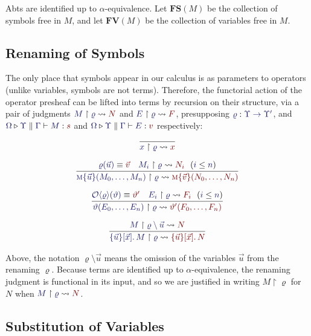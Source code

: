 \documentclass[11pt]{article}
\theoremstyle{definition}
\theoremstyle{remark}
\numberwithin{equation}{section}
\def\IModeColorName{MidnightBlue}
\def\OModeColorName{Maroon}
\newcommand\IMode[1]{{\color{\IModeColorName}{#1}}}
\newcommand\OMode[1]{{\color{\OModeColorName}{#1}}}
\newcommand\HypJ[2]{#1\ \ (#2)}
\newcommand\Of[2]{\IMode{#1} : \IMode{#2}}
\newcommand\MkBTm[3]{\{#1\}[#2].\, #3}
\newcommand\Leq[2]{\IMode{#1}\leq\IMode{#2}}
\newcommand\Match[2]{\IMode{#1}\equiv\OMode{#2}}
\newcommand\Operators{\mathcal{O}}
\newcommand\FLift[2]{
  \Operators\langle#1%
  \ifthenelse{\equal{#2}{}}{}{, #2}\rangle
}
\newcommand\IsAbt[5]{%
  \IMode{#1}\triangleright%
  \IMode{#2}\parallel%
  \IMode{#3}\vdash%
  \IMode{#4}:\OMode{#5}%
}
\newcommand\MV[1]{\textsc{#1}}
\newcommand\MApp[3]{#1\{#2\}(#3)}
\newcommand\App[2]{#1(#2)}
\newcommand\FV[1]{\mathbf{FV}\left(#1\right)}
\newcommand\FS[1]{\mathbf{FS}\left(#1\right)}
\newcommand\Rename[2]{
  #2\upharpoonright #1
}
\newcommand\IsRenaming[3]{
  \Rename{\IMode{#1}}{\IMode{#2}}%
  \leadsto\OMode{#3}%
}
\begin{document}
Abts are identified up to $\alpha$-equivalence. Let $\FS{M}$ be the collection
of symbols free in $M$, and let $\FV{M}$ be the collection of variables free in
$M$. %

\subsection{Renaming of Symbols}

The only place that symbols appear in our calculus is as parameters to
operators (unlike variables, symbols are not terms). Therefore, the functorial
action of the operator presheaf can be lifted into terms by recursion on their
structure, via a pair of judgments $\IsRenaming{\varrho}{M}{N}$ and
$\IsRenaming{\varrho}{E}{F}$, presupposing
$\Of{\varrho}{\Upsilon\to\Upsilon'}$, and $\IsAbt{\Omega}{\Upsilon}{\Gamma}{M}{s}$
and $\IsAbt{\Omega}{\Upsilon}{\Gamma}{E}{v}$ respectively:

\begin{gather*}
  \infer{
    \IsRenaming{\varrho}{x}{x}
  }{
  }\\[6pt]
  \infer{
    \IsRenaming{\varrho}{
      \MApp{\MV{m}}{\vec{u}}{M_0,\dots,M_n}
    }{
      \MApp{\MV{m}}{\vec{v}}{N_0,\dots,N_n}
    }
  }{
    \Match{\varrho(\vec{u})}{\vec{v}} &
    \HypJ{
      \IsRenaming{\varrho}{M_i}{N_i}
    }{
      \Leq{i}{n}
    }
  }\\[6pt]
  \infer{
    \IsRenaming{\varrho}{
      \App{\vartheta}{E_0,\dots,E_n}
    }{
      \App{\vartheta'}{F_0,\dots,F_n}
    }
  }{
    \Match{\FLift{\varrho}{}(\vartheta)}{\vartheta'} &
    \HypJ{
      \IsRenaming{\varrho}{E_i}{F_i}
    }{
      \Leq{i}{n}
    }
  }\\[6pt]
  \infer{
    \IsRenaming{\varrho}{
      \MkBTm{\vec{u}}{\vec{x}}{M}
    }{
      \MkBTm{\vec{u}}{\vec{x}}{N}
    }
  }{
    \IsRenaming{\varrho\setminus\vec{u}}{M}{N}
  }
\end{gather*}

Above, the notation $\varrho\setminus\vec{u}$ means the omission of the
variables $\vec{u}$ from the renaming $\varrho$. Because terms are identified
up to $\alpha$-equivalence, the renaming judgment is functional in its input,
and so we are justified in writing $\Rename{\varrho}{M}$ for $N$ when
$\IsRenaming{\varrho}{M}{N}$.


\subsection{Substitution of Variables}
\end{document}
